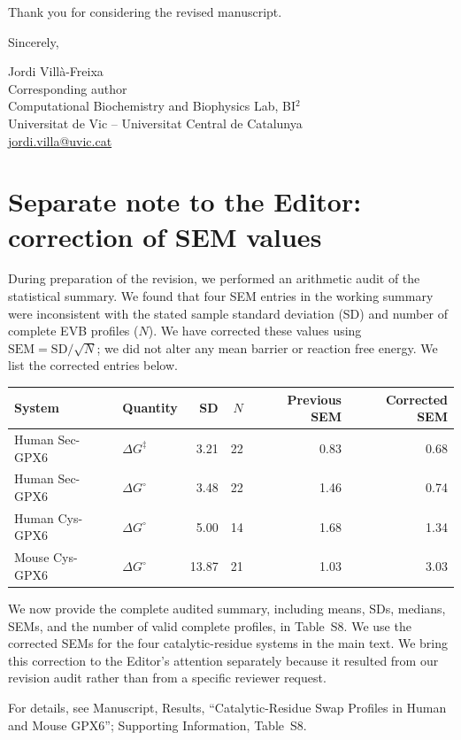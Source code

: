 \documentclass[11pt]{article}
\newcommand{\Location}[1]{\par\noindent For details, see #1\par}
\begin{document}
Thank you for considering the revised manuscript.

Sincerely,

Jordi Vill\`a-Freixa\\
Corresponding author\\
Computational Biochemistry and Biophysics Lab, BI$^2$\\
Universitat de Vic -- Universitat Central de Catalunya\\
\href{mailto:jordi.villa@uvic.cat}{jordi.villa@uvic.cat}

\newpage
\section*{Separate note to the Editor: correction of SEM values}

During preparation of the revision, we performed an arithmetic audit of the statistical
summary. We found that four SEM entries in the working summary were inconsistent with
the stated sample standard deviation (SD) and number of complete EVB profiles ($N$).
We have corrected these values using $\mathrm{SEM}=\mathrm{SD}/\sqrt{N}$; we did not alter
any mean barrier or reaction free energy. We list the corrected entries below.

\begin{center}
\small
\begin{tabular}{llrrrr}
\toprule
System & Quantity & SD & $N$ & Previous SEM & Corrected SEM \\
\midrule
Human Sec-GPX6 & $\Delta G^{\ddagger}$ & 3.21 & 22 & 0.83 & 0.68 \\
Human Sec-GPX6 & $\Delta G^{\circ}$     & 3.48 & 22 & 1.46 & 0.74 \\
Human Cys-GPX6 & $\Delta G^{\circ}$     & 5.00 & 14 & 1.68 & 1.34 \\
Mouse Cys-GPX6 & $\Delta G^{\circ}$     & 13.87 & 21 & 1.03 & 3.03 \\
\bottomrule
\end{tabular}
\end{center}

We now provide the complete audited summary, including means, SDs, medians, SEMs, and
the number of valid complete profiles, in Table~S8. We use the corrected SEMs for the
four catalytic-residue systems in the main text. We bring this correction to
the Editor's attention separately because it resulted from our revision audit rather than
from a specific reviewer request.

\Location{Manuscript, Results, ``Catalytic-Residue Swap Profiles in Human and Mouse GPX6''; Supporting Information, Table~S8.}
\end{document}
